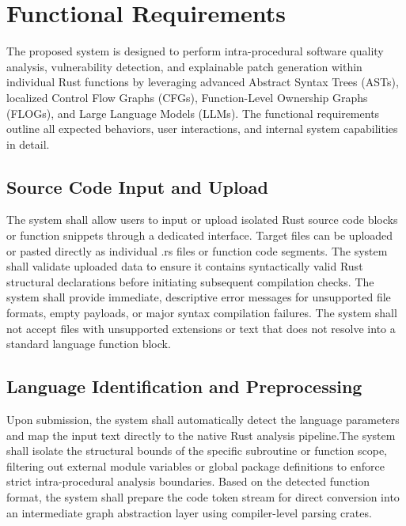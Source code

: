 \section{Functional Requirements}
\hspace{0.5cm}
The proposed system is designed to perform intra-procedural software quality analysis, vulnerability detection, and explainable patch generation within individual Rust functions by leveraging advanced Abstract Syntax Trees (ASTs), localized Control Flow Graphs (CFGs), Function-Level Ownership Graphs (FLOGs), and Large Language Models (LLMs). The functional requirements outline all expected behaviors, user interactions, and internal system capabilities in detail. 

\subsection{Source Code Input and Upload}
\hspace{0.5cm}
The system shall allow users to input or upload isolated Rust source code blocks or function snippets through a dedicated interface. Target files can be uploaded or pasted directly as individual .rs files or function code segments. The system shall validate uploaded data to ensure it contains syntactically valid Rust structural declarations before initiating subsequent compilation checks. The system shall provide immediate, descriptive error messages for unsupported file formats, empty payloads, or major syntax compilation failures. The system shall not accept files with unsupported extensions or text that does not resolve into a standard language function block.

\subsection{Language Identification and Preprocessing}
\hspace{0.5cm}
Upon submission, the system shall automatically detect the language parameters and map the input text directly to the native Rust analysis pipeline.The system shall isolate the structural bounds of the specific subroutine or function scope, filtering out external module variables or global package definitions to enforce strict intra-procedural analysis boundaries.  Based on the detected function format, the system shall prepare the code token stream for direct conversion into an intermediate graph abstraction layer using compiler-level parsing crates.

